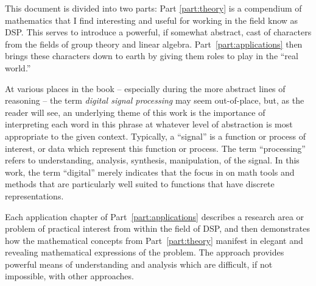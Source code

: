 %
%
%

\preface



This document is divided into two parts: Part \ref{part:theory} is a compendium 
of mathematics that I find interesting and useful for working in the field know
as \ac{DSP}.  
This serves to introduce a powerful, if somewhat abstract, cast
of characters from the fields of group theory and linear algebra.
Part~\ref{part:applications} then brings these characters down to earth by
giving them roles to play in the ``real world.''  

At various places in the book -- especially during the more abstract lines of
reasoning -- the term \emph{digital signal processing} may seem out-of-place,
but, as the reader will see, an underlying theme of this work is the
importance of interpreting each word in this phrase at whatever level of
abstraction is most appropriate to the given context.  Typically,
a ``signal'' is a function or process of interest, or data
which represent this function or process.  The term ``processing'' refers to
understanding, analysis, synthesis, manipulation, \etc of the signal.  In this
work, the term ``digital'' merely indicates that the focus in on math tools and
methods that are particularly well suited to functions that have discrete representations.    

Each application chapter of Part~\ref{part:applications} describes a research area or
problem of practical interest from within the field of \ac{DSP}, and
then demonstrates how the mathematical concepts from Part~\ref{part:theory} 
manifest in elegant and revealing mathematical expressions of the problem.
The approach provides powerful means of understanding and analysis 
which are difficult, if not impossible, with other approaches.

